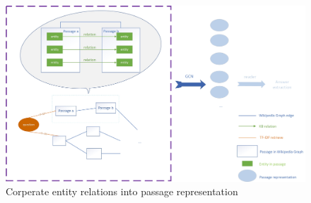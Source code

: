 \documentclass[sigconf]{acmart}
\begin{document}
	\begin{figure}[ht]		
		\centering
		\includegraphics[scale=0.6]{f1.jpg}
		\caption{Corperate entity relations into passage representation}
		\label{fig:label}
	\end{figure}
	
	
	
	
	
	
	
	
	
\end{document}
